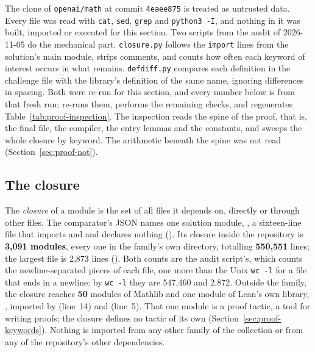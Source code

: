 The clone of \texttt{openai/math} at commit \texttt{4eaee875} is treated
as untrusted data. Every file was read with \texttt{cat}, \texttt{sed},
\texttt{grep} and \texttt{python3 -I}, and nothing in it was built,
imported or executed for this section. Two scripts from the audit of
2026-11-05 do the mechanical part. \texttt{closure.py} follows the
\texttt{import} lines from the solution's main module, strips comments,
and counts how often each keyword of interest occurs in what remains.
\texttt{defdiff.py} compares each definition in the challenge file with
the library's definition of the same name, ignoring differences in
spacing. Both were re-run for this section, and every number below is
from that fresh run; 
re-runs them, performs the remaining checks, and regenerates
Table~\ref{tab:proof-inspection}. The inspection reads the spine of the
proof, that is, the final file, the compiler, the entry lemmas and the
constants, and sweeps the whole closure by keyword. The arithmetic
beneath the spine was not read (Section~\ref{sec:proof-not}).

\subsection{The closure}
\label{sec:proof-closure}

The \emph{closure} of a module is the set of all files it depends on,
directly or through other files. The comparator's JSON names one
solution module, , a
sixteen-line file that imports  and
 and declares nothing (). Its closure inside the repository is
\textbf{3,091 modules}, every one in the family's own directory,
totalling \textbf{550,551} lines; the largest file is 2,873 lines
(). Both
counts are the audit script's, which counts the newline-separated pieces
of each file, one more than the Unix \texttt{wc -l} for a file that ends
in a newline: by \texttt{wc -l} they are 547,460 and 2,872.
Outside the family, the closure reaches \textbf{50} modules of Mathlib
and one module of Lean's own library, ,
imported by  (line~14) and
 (line~5).
That one module is a proof tactic, a tool for writing proofs; the
closure defines no tactic of its own (Section~\ref{sec:proof-keywords}).
Nothing is imported from any other family of the collection or from
any of the repository's other dependencies.

